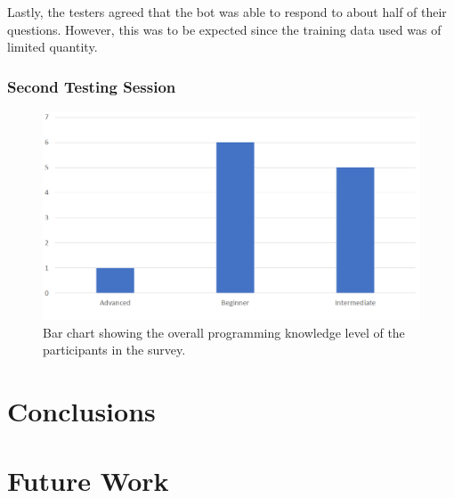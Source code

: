 \documentclass[12pt,a4paper]{article}
\newcommand{\captionstyle}[1] {
    \small{#1}
}
\begin{document}
Lastly, the testers agreed that the bot was able to respond to about half of their questions. However, this was to be expected since the training data used was of limited quantity.


\subsubsection{Second Testing Session}


\begin{figure}[!htb]%
    \centering
    \includegraphics[width=0.9\columnwidth]{prog_knowledge}%
    \caption{\captionstyle{Bar chart showing the overall programming knowledge level of the participants in the survey.}}%
    \label{fig:progknowl}%
\end{figure}


\newpage
\section{Conclusions}

\newpage
\section{Future Work}

\newpage


\end{document}
